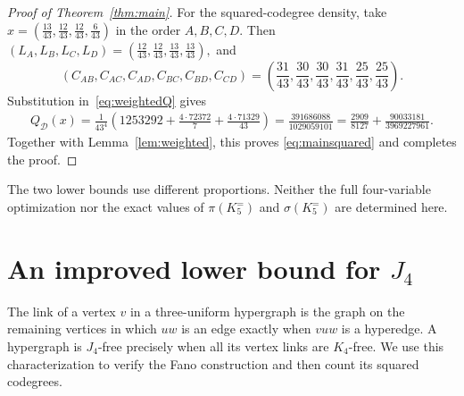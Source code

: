 \documentclass[11pt]{article}
\theoremstyle{remark}
\numberwithin{equation}{section}
\newcommand{\F}{K_5^{=}}
\begin{document}
\begin{proof}[Proof of Theorem~\ref{thm:main}]
For the squared-codegree density, take
$x=\left(\frac{13}{43},\frac{12}{43},\frac{12}{43},\frac{6}{43}\right)$ in the
order $A,B,C,D$. Then
\(
 (L_A,L_B,L_C,L_D)
 =\left(\frac{12}{43},\frac{12}{43},\frac{13}{43},\frac{13}{43}\right),\)
 and
\[ (C_{AB},C_{AC},C_{AD},C_{BC},C_{BD},C_{CD})
 =\left(\frac{31}{43},\frac{30}{43},\frac{30}{43},
          \frac{31}{43},\frac{25}{43},\frac{25}{43}\right).
\]
Substitution in~\eqref{eq:weightedQ} gives
\begin{equation*}
 \begin{split}
 Q_{\mathcal D}(x)
 =\frac{1}{43^4}\left(1253292+\frac{4\cdot72372}{7}
                      +\frac{4\cdot71329}{43}\right)
 =\frac{391686088}{1029059101}
  =\frac{2909}{8127}+\frac{90033181}{3969227961}.
 \end{split}
\end{equation*}
Together with Lemma~\ref{lem:weighted}, this proves
\eqref{eq:mainsquared} and completes the proof.
\end{proof}

The two lower bounds use different proportions. Neither the full
four-variable optimization nor the exact values of $\pi(\F)$ and
$\sigma(\F)$ are determined here.

\section{An improved lower bound for \texorpdfstring{$J_4$}{J4}}\label{sec:J4}

The link of a vertex $v$ in a three-uniform hypergraph is the graph on
the remaining vertices in which $uw$ is an edge exactly when $vuw$ is
a hyperedge. A hypergraph is $J_4$-free precisely when all its vertex
links are $K_4$-free. We use this characterization to verify the Fano
construction and then count its squared codegrees.
\end{document}
